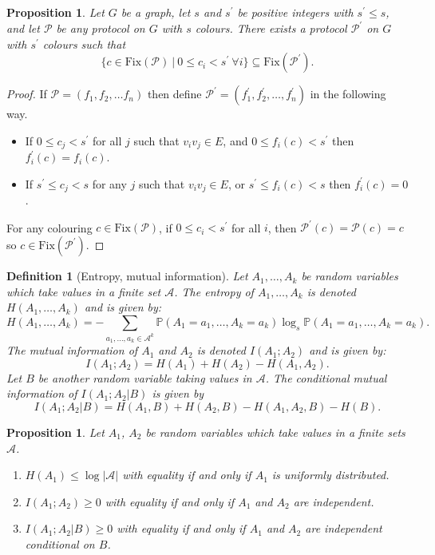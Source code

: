 \documentclass{birkjour}
\newtheorem{prop}[thm]{Proposition}
\theoremstyle{indenteddefinition}
\newtheorem{defn}[thm]{Definition}
\theoremstyle{indenteddefinition}
\numberwithin{equation}{section}
\renewcommand{\P}{\mathbb{P}}
\renewcommand{\Pr}{\mathcal{P}}
\newcommand{\Fix}{\mbox{Fix}}
\begin{document}
\begin{prop}
\label{prop:monotone}
Let $G$ be a graph, let $s$ and $s^\prime$ be positive integers with $s^\prime \leq s$, and let $\Pr$ be any protocol on $G$ with $s$ colours. There exists a protocol $\Pr^\prime$ on $G$ with $s^\prime$ colours such that 
	$$ \big\{ c \in \Fix(\Pr) \: \big| \: 0 \leq c_i < s^\prime \: \forall i \big\} \subseteq \Fix(\Pr^\prime). $$
\end{prop}
\begin{proof}
If $\Pr = (f_1,f_2, \ldots f_n)$ then define $\Pr^\prime = (f_1^\prime,f_2^\prime, \ldots ,f_n^\prime )$ in the following way.
\begin{itemize}
\item If $0 \leq c_j<s^\prime$ for all $j$ such that $v_iv_j \in E$, and $0 \leq f_i(c)<s^\prime$ then $f_i^\prime(c) = f_i(c)$.
\item If $s^\prime \leq c_j < s$ for any $j$ such that $v_iv_j \in E$, or $s^\prime \leq f_i(c) < s$ then $f_i^\prime(c) = 0$.
\end{itemize}
For any colouring $c \in \Fix(\Pr)$, if $0 \leq c_i < s^\prime$ for all $i$, then $\Pr^\prime(c) = \Pr(c) = c$ so $c \in \Fix(\Pr^\prime)$.
\end{proof}

\begin{defn}[Entropy, mutual information]
\label{defn:entropy}
Let $A_1, \ldots, A_k$ be random variables which take values in a finite set $\mathcal{A}$. The \emph{entropy} of $A_1,\ldots, A_k$ is denoted $H(A_1,\ldots, A_k)$ and is given by:
	$$ H(A_1,\ldots,A_k) = -\sum_{a_1,\ldots,a_k \in \mathcal{A}^k} \P(A_1=a_1,\ldots,A_k=a_k) \log_s \P(A_1=a_1,\ldots,A_k=a_k). $$	
The \emph{mutual information} of $A_1$ and $A_2$ is denoted $I(A_1;A_2)$ and is given by: 
	$$ I(A_1;A_2) = H(A_1) + H(A_2) - H(A_1,A_2). $$
	Let $B$ be another random variable taking values in $\mathcal{A}$. The conditional mutual information of $I(A_1;A_2|B)$ is given by
	\begin{equation}
	I(A_1;A_2|B) = H(A_1,B) + H(A_2,B) - H(A_1,A_2,B) - H(B).
	\label{eq:conditional_mutual_information}
	\end{equation}
\end{defn}

\begin{prop}
\label{prop:known_entropy_results}
Let $A_1$, $A_2$ be random variables which take values in a finite sets $\mathcal{A}$. 
\begin{enumerate}
\item $H(A_1) \leq \log |\mathcal{A}|$ with equality if and only if $A_1$ is uniformly distributed. 
\item $I(A_1;A_2) \geq 0$ with equality if and only if $A_1$ and $A_2$ are independent.
\item $I(A_1;A_2|B) \geq 0$ with equality if and only if $A_1$ and $A_2$ are independent conditional on $B$. 
\end{enumerate}
\end{prop}
\end{document}
